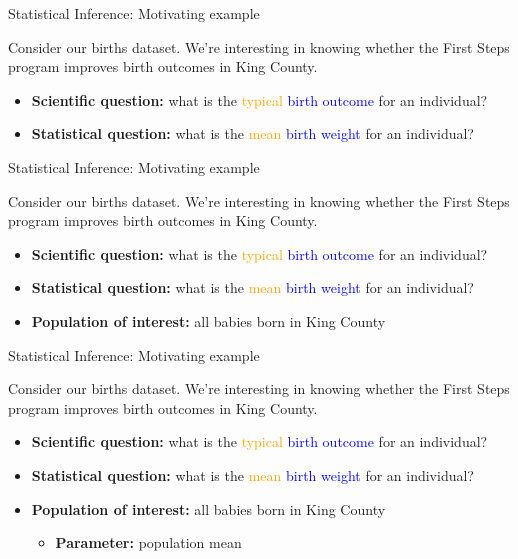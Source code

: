 \documentclass[10pt,t]{beamer}
\begin{document}
\begin{frame}{Statistical Inference: Motivating example}

Consider our births dataset. We're interesting in knowing whether the First Steps program improves birth outcomes in King County.

\vspace{0.1cm}

\begin{itemize}
	\item \textbf{Scientific question:} what is the \textcolor{orange}{typical}  \textcolor{blue}{birth outcome} for an individual?
	\item \textbf{Statistical question:} what is the \textcolor{orange}{mean} \textcolor{blue}{birth weight} for an individual?
\end{itemize}

\end{frame}

\begin{frame}{Statistical Inference: Motivating example}

Consider our births dataset. We're interesting in knowing whether the First Steps program improves birth outcomes in King County.

\vspace{0.1cm}

\begin{itemize}
	\item \textbf{Scientific question:} what is the \textcolor{orange}{typical}  \textcolor{blue}{birth outcome} for an individual?
	\item \textbf{Statistical question:} what is the \textcolor{orange}{mean} \textcolor{blue}{birth weight} for an individual?
	\item \textbf{Population of interest:} all babies born in King County
\end{itemize}

\end{frame}

\begin{frame}{Statistical Inference: Motivating example}

Consider our births dataset. We're interesting in knowing whether the First Steps program improves birth outcomes in King County.

\vspace{0.1cm}

\begin{itemize}
	\item \textbf{Scientific question:} what is the \textcolor{orange}{typical}  \textcolor{blue}{birth outcome} for an individual?
	\item \textbf{Statistical question:} what is the \textcolor{orange}{mean} \textcolor{blue}{birth weight} for an individual?
	\item \textbf{Population of interest:} all babies born in King County
	\begin{itemize}
		\item \textbf{Parameter:} population mean
	\end{itemize}
\end{itemize}

\end{frame}
\end{document}
